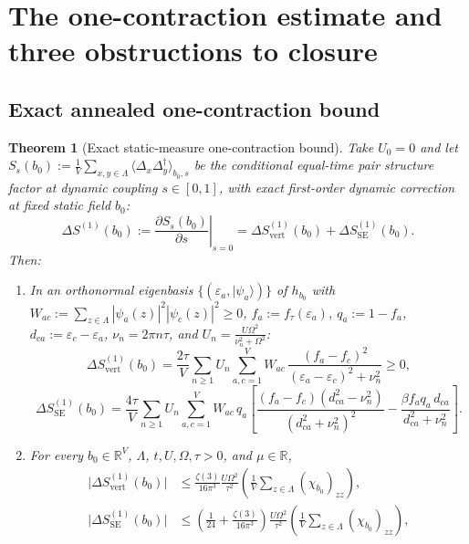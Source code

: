 \documentclass[11pt]{article}
\newtheorem{theorem}{Theorem}[section]
\theoremstyle{definition}
\theoremstyle{remark}
\DeclareMathOperator{\vertop}{vert}
\DeclareMathOperator{\SE}{SE}
\newcommand{\R}{\mathbb{R}}
\begin{document}
\section{The one-contraction estimate and three obstructions to closure}
\label{sec:onecontraction}

\subsection{Exact annealed one-contraction bound}

\begin{theorem}[Exact static-measure one-contraction bound]
\label{thm:C1}
Take $U_0 = 0$ and let $S_s(b_0) := \frac{1}{V}\sum_{x,y\in\Lambda} \langle \Delta_x \Delta_y^\dagger \rangle_{b_0, s}$ be the conditional equal-time pair structure factor at dynamic coupling $s \in [0,1]$, with exact first-order dynamic correction at fixed static field $b_0$:
\[
\Delta S^{(1)}(b_0) := \left.\frac{\partial S_s(b_0)}{\partial s}\right|_{s=0} = \Delta S^{(1)}_{\vertop}(b_0) + \Delta S^{(1)}_{\SE}(b_0).
\]
Then:
\begin{enumerate}[label=(\roman*),leftmargin=2.2em]
\item In an orthonormal eigenbasis $\{(\varepsilon_a, |\psi_a\rangle)\}$ of $h_{b_0}$ with $W_{ac} := \sum_{z\in\Lambda} |\psi_a(z)|^2 |\psi_c(z)|^2 \ge 0$, $f_a := f_\tau(\varepsilon_a)$, $q_a := 1 - f_a$, $d_{ca} := \varepsilon_c - \varepsilon_a$, $\nu_n = 2\pi n\tau$, and $U_n = \frac{U\Omega^2}{\nu_n^2 + \Omega^2}$:
\begin{equation}
\Delta S^{(1)}_{\vertop}(b_0) = \frac{2\tau}{V} \sum_{n \ge 1} U_n \sum_{a,c=1}^V W_{ac}\, \frac{(f_a - f_c)^2}{(\varepsilon_a - \varepsilon_c)^2 + \nu_n^2} \ge 0,
\label{eq:C1_vert}
\end{equation}
\begin{equation}
\Delta S^{(1)}_{\SE}(b_0) = \frac{4\tau}{V} \sum_{n \ge 1} U_n \sum_{a,c=1}^V W_{ac}\, q_a \left[\frac{(f_a - f_c)(d_{ca}^2 - \nu_n^2)}{(d_{ca}^2 + \nu_n^2)^2} - \frac{\beta f_a q_a\, d_{ca}}{d_{ca}^2 + \nu_n^2}\right].
\label{eq:C1_SE}
\end{equation}
\item For every $b_0 \in \R^V$, $\Lambda$, $t, U, \Omega, \tau > 0$, and $\mu \in \R$,
\begin{align}
\bigl|\Delta S^{(1)}_{\vertop}(b_0)\bigr| &\le \frac{\zeta(3)}{16\pi^3} \frac{U\Omega^2}{\tau^2}\left(\frac{1}{V}\sum_{z\in\Lambda} (\chi_{b_0})_{zz}\right), \nonumber\\
\bigl|\Delta S^{(1)}_{\SE}(b_0)\bigr| &\le \left(\frac{1}{24} + \frac{\zeta(3)}{16\pi^3}\right) \frac{U\Omega^2}{\tau^2}\left(\frac{1}{V}\sum_{z\in\Lambda} (\chi_{b_0})_{zz}\right),

\end{align}
\end{enumerate}
\end{theorem}
\end{document}
